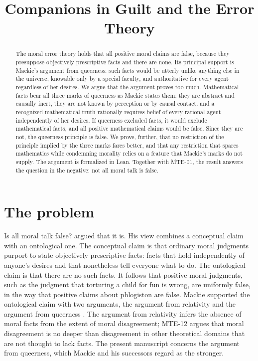 \documentclass{situationist-preprint}
\title{Companions in Guilt and the Error Theory}
\begin{document}
\maketitle

\begin{abstract}
The moral error theory holds that all positive moral claims are false, because they presuppose objectively prescriptive facts and there are none. Its principal support is Mackie's argument from queerness: such facts would be utterly unlike anything else in the universe, knowable only by a special faculty, and authoritative for every agent regardless of her desires. We argue that the argument proves too much. Mathematical facts bear all three marks of queerness as Mackie states them: they are abstract and causally inert, they are not known by perception or by causal contact, and a recognized mathematical truth rationally requires belief of every rational agent independently of her desires. If queerness excluded facts, it would exclude mathematical facts, and all positive mathematical claims would be false. Since they are not, the queerness principle is false. We prove, further, that no restriction of the principle implied by the three marks fares better, and that any restriction that spares mathematics while condemning morality relies on a feature that Mackie's marks do not supply. The argument is formalized in Lean. Together with MTE-01, the result answers the question in the negative: not all moral talk is false.
\end{abstract}

\section{The problem}

Is all moral talk false? \citet{Mackie1977} argued that it is. His view combines a conceptual claim with an ontological one. The conceptual claim is that ordinary moral judgments purport to state objectively prescriptive facts: facts that hold independently of anyone's desires and that nonetheless tell everyone what to do. The ontological claim is that there are no such facts. It follows that positive moral judgments, such as the judgment that torturing a child for fun is wrong, are uniformly false, in the way that positive claims about phlogiston are false. Mackie supported the ontological claim with two arguments, the argument from relativity and the argument from queerness \citep[ch.~1, \S\S 8--9]{Mackie1977}. The argument from relativity infers the absence of moral facts from the extent of moral disagreement; MTE-12 argues that moral disagreement is no deeper than disagreement in other theoretical domains that are not thought to lack facts. The present manuscript concerns the argument from queerness, which Mackie and his successors regard as the stronger.
\end{document}
